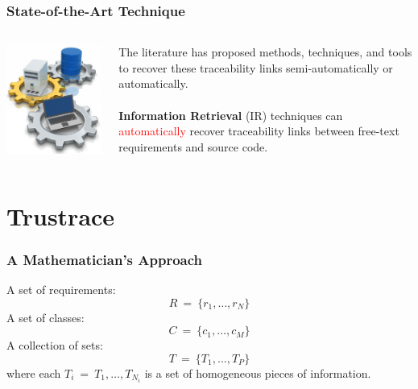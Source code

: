 \documentclass[12pt,hyperref=true,mathserif]{beamer}
\begin{document}
\begin{frame}
\frametitle{State-of-the-Art Technique}
\begin{columns}
\begin{column}{0.5\textwidth}
\includegraphics[scale=0.4]{Automation}
\end{column}
\begin{column}{0.5\textwidth}
The literature has proposed methods, techniques, and tools to recover these traceability links semi-automatically or automatically.\\
~\\
\textbf{Information Retrieval} (IR) techniques can \textcolor{red}{automatically} recover traceability links between free-text requirements and source code.
\end{column}
\end{columns}
\end{frame}

\section{Trustrace}
\begin{frame}
\frametitle{A Mathematician's Approach}
A set of requirements:
\begin{equation}
\label{equ:Requirements}
  R~=~\{r_{1},\ldots,r_{N}\}
\end{equation}
A set of classes:
\begin{equation}
\label{equ:Classes}
  C~=~\{c_{1},\ldots,c_{M}\}
\end{equation}  
A collection of sets:
\begin{equation}
\label{equ:Sets}
  T~=~\{T_{1},\ldots,T_{P}\}
\end{equation}
where each $T_{i}~=~{T_{1},\ldots,T_{N_{i}}}$ is a set of homogeneous pieces of information.
\end{frame}
\end{document}
